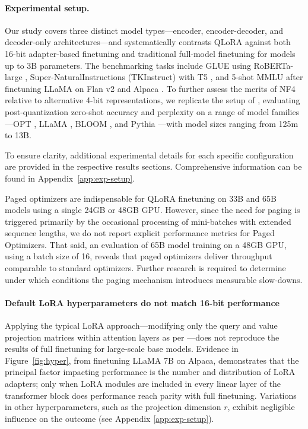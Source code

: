 \paragraph{Experimental setup.} Our study covers three distinct model types—encoder, encoder-decoder, and decoder-only architectures—and systematically contrasts QLoRA against both 16-bit adapter-based finetuning and traditional full-model finetuning for models up to 3B parameters. The benchmarking tasks include GLUE \citep{wang2018glue} using RoBERTa-large \citep{liu2019roberta}, Super-NaturalInstructions (TKInstruct) \citep{wang2022super} with T5 \citep{t5}, and 5-shot MMLU \citep{hendrycksmeasuring} after finetuning LLaMA on Flan v2 \citep{longpre2023flan} and Alpaca \citep{alpaca}. To further assess the merits of NF4 relative to alternative 4-bit representations, we replicate the setup of \citet{dettmers2022case}, evaluating post-quantization zero-shot accuracy and perplexity on a range of model families—OPT \citep{zhang2022opt}, LLaMA \citep{touvron2023llama}, BLOOM \citep{scao2022bloom}, and Pythia \citep{biderman2023pythia}—with model sizes ranging from 125m to 13B.

To ensure clarity, additional experimental details for each specific configuration are provided in the respective results sections. Comprehensive information can be found in Appendix~\ref{app:exp-setup}.

Paged optimizers are indispensable for QLoRA finetuning on 33B and 65B models using a single 24GB or 48GB GPU. However, since the need for paging is triggered primarily by the occasional processing of mini-batches with extended sequence lengths, we do not report explicit performance metrics for Paged Optimizers. That said, an evaluation of 65B model training on a 48GB GPU, using a batch size of 16, reveals that paged optimizers deliver throughput comparable to standard optimizers. Further research is required to determine under which conditions the paging mechanism introduces measurable slow-downs.

\paragraph{Default LoRA hyperparameters do not match 16-bit performance} 

Applying the typical LoRA approach—modifying only the query and value projection matrices within attention layers as per \citep{hu2021lora}—does not reproduce the results of full finetuning for large-scale base models. Evidence in Figure~\ref{fig:hyper}, from finetuning LLaMA 7B on Alpaca, demonstrates that the principal factor impacting performance is the number and distribution of LoRA adapters; only when LoRA modules are included in every linear layer of the transformer block does performance reach parity with full finetuning. Variations in other hyperparameters, such as the projection dimension $r$, exhibit negligible influence on the outcome (see Appendix \ref{app:exp-setup}).

